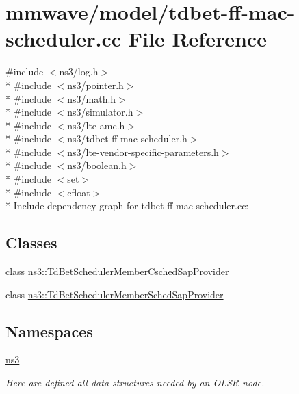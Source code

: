 \hypertarget{mmwave_2model_2tdbet-ff-mac-scheduler_8cc}{}\section{mmwave/model/tdbet-\/ff-\/mac-\/scheduler.cc File Reference}
\label{mmwave_2model_2tdbet-ff-mac-scheduler_8cc}
{\ttfamily \#include $<$ns3/log.\+h$>$}\\*
{\ttfamily \#include $<$ns3/pointer.\+h$>$}\\*
{\ttfamily \#include $<$ns3/math.\+h$>$}\\*
{\ttfamily \#include $<$ns3/simulator.\+h$>$}\\*
{\ttfamily \#include $<$ns3/lte-\/amc.\+h$>$}\\*
{\ttfamily \#include $<$ns3/tdbet-\/ff-\/mac-\/scheduler.\+h$>$}\\*
{\ttfamily \#include $<$ns3/lte-\/vendor-\/specific-\/parameters.\+h$>$}\\*
{\ttfamily \#include $<$ns3/boolean.\+h$>$}\\*
{\ttfamily \#include $<$set$>$}\\*
{\ttfamily \#include $<$cfloat$>$}\\*
Include dependency graph for tdbet-\/ff-\/mac-\/scheduler.cc\+:
\subsection*{Classes}
\begin{DoxyCompactItemize}
\item 
class \hyperlink{classns3_1_1TdBetSchedulerMemberCschedSapProvider}{ns3\+::\+Td\+Bet\+Scheduler\+Member\+Csched\+Sap\+Provider}
\item 
class \hyperlink{classns3_1_1TdBetSchedulerMemberSchedSapProvider}{ns3\+::\+Td\+Bet\+Scheduler\+Member\+Sched\+Sap\+Provider}
\end{DoxyCompactItemize}
\subsection*{Namespaces}
\begin{DoxyCompactItemize}
\item 
 \hyperlink{namespacens3}{ns3}
\begin{DoxyCompactList}\small\item\em Here are defined all data structures needed by an O\+L\+SR node. \end{DoxyCompactList}\end{DoxyCompactItemize}
